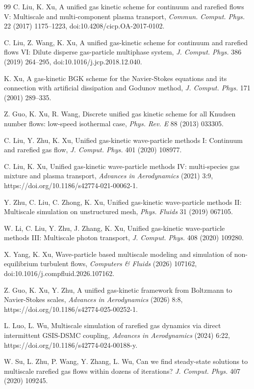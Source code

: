 \documentclass[preprint,12pt]{elsarticle}
\begin{document}
\begin{thebibliography}{99}
C. Liu, K. Xu,
A unified gas kinetic scheme for continuum and rarefied flows V:
Multiscale and multi-component plasma transport,
\textit{Commun. Comput. Phys.} 22 (2017) 1175--1223,
doi:10.4208/cicp.OA-2017-0102.

C. Liu, Z. Wang, K. Xu,
A unified gas-kinetic scheme for continuum and rarefied flows VI:
Dilute disperse gas-particle multiphase system,
\textit{J. Comput. Phys.} 386 (2019) 264--295,
doi:10.1016/j.jcp.2018.12.040.

K. Xu,
A gas-kinetic BGK scheme for the Navier-Stokes equations and its connection
with artificial dissipation and Godunov method,
\textit{J. Comput. Phys.} 171 (2001) 289--335.

Z. Guo, K. Xu, R. Wang,
Discrete unified gas kinetic scheme for all Knudsen number flows:
low-speed isothermal case,
\textit{Phys. Rev. E} 88 (2013) 033305.

C. Liu, Y. Zhu, K. Xu,
Unified gas-kinetic wave-particle methods I: Continuum and rarefied gas flow,
\textit{J. Comput. Phys.} 401 (2020) 108977.

C. Liu, K. Xu,
Unified gas-kinetic wave-particle methods IV: multi-species gas mixture and plasma transport,
\textit{Advances in Aerodynamics} (2021) 3:9,
https://doi.org/10.1186/s42774-021-00062-1.


Y. Zhu, C. Liu, C. Zhong, K. Xu,
Unified gas-kinetic wave-particle methods II: Multiscale simulation on
unstructured mesh,
\textit{Phys. Fluids} 31 (2019) 067105.

W. Li, C. Liu, Y. Zhu, J. Zhang, K. Xu,
Unified gas-kinetic wave-particle methods III: Multiscale photon transport,
\textit{J. Comput. Phys.} 408 (2020) 109280.

X. Yang, K. Xu,
Wave-particle based multiscale modeling and simulation of non-equilibrium turbulent flows,
\textit{Computers \& Fluids} (2026) 107162,
doi:10.1016/j.compfluid.2026.107162.



Z. Guo, K. Xu, Y. Zhu,
A unified gas-kinetic framework from Boltzmann to Navier-Stokes scales,
\textit{Advances in Aerodynamics} (2026) 8:8,
https://doi.org/10.1186/s42774-025-00252-1.


L. Luo, L. Wu,
Multiscale simulation of rarefied gas dynamics via direct intermittent GSIS-DSMC coupling,
\textit{Advances in Aerodynamics} (2024) 6:22,
https://doi.org/10.1186/s42774-024-00188-y.


W. Su, L. Zhu, P. Wang, Y. Zhang, L. Wu,
Can we find steady-state solutions to multiscale rarefied gas flows within dozens
of iterations?
\textit{J. Comput. Phys.} 407 (2020) 109245.

\end{thebibliography}
\end{document}
